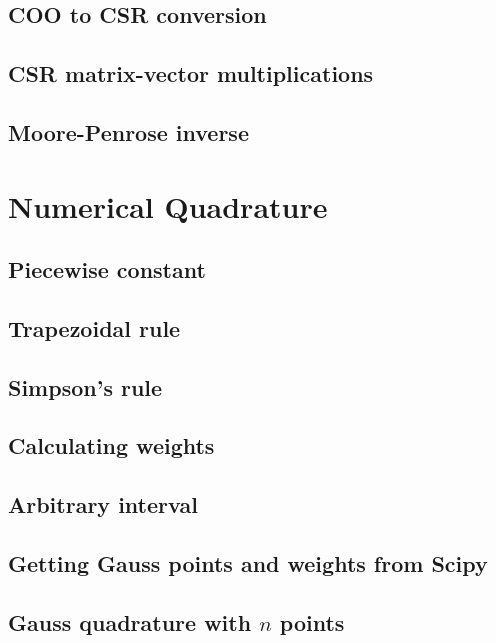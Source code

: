 \documentclass[article,A4,12pt]{llncs}
\begin{document}
\subsection{COO to CSR conversion}


\subsection{CSR matrix-vector multiplications}


\subsection{Moore-Penrose inverse}




\section{Numerical Quadrature}


\subsection{Piecewise constant}


\subsection{Trapezoidal rule}


\subsection{Simpson's rule}


\subsection{Calculating weights}


\subsection{Arbitrary interval}


\subsection{Getting Gauss points and weights from Scipy}


\subsection{Gauss quadrature with $n$ points}
\end{document}
